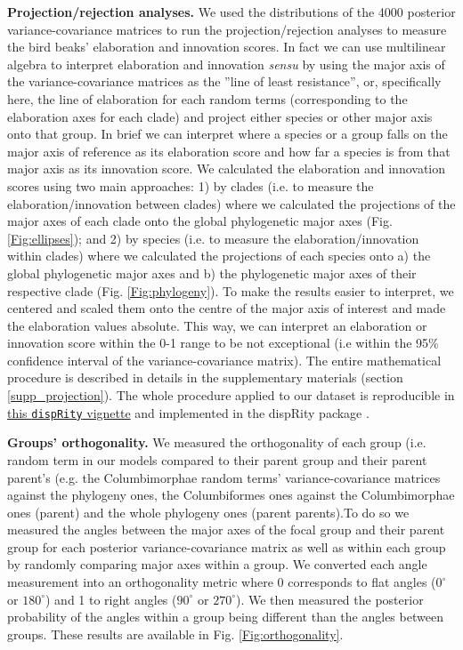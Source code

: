 \documentclass[12pt,letterpaper]{article}
\begin{document}
\textbf{Projection/rejection analyses.}
We used the distributions of the 4000 posterior variance-covariance matrices to run the projection/rejection analyses to measure the bird beaks' elaboration and innovation scores.
In fact we can use multilinear algebra to interpret elaboration and innovation \textit{sensu} \cite{endler2005animal} by using the major axis of the variance-covariance matrices as the ''line of least resistance'', or, specifically here, the line of elaboration for each random terms (corresponding to the elaboration axes for each clade) and project either species or other major axis onto that group.
In brief we can interpret where a species or a group falls on the major axis of reference as its elaboration score and how far a species is from that major axis as its innovation score.
We calculated the elaboration and innovation scores using two main approaches:
1) by clades (i.e. to measure the elaboration/innovation between clades) where we calculated the projections of the major axes of each clade onto the global phylogenetic major axes (Fig. \ref{Fig:ellipses});
and 2) by species (i.e. to measure the elaboration/innovation within clades) where we calculated the projections of each species onto a) the global phylogenetic major axes and b) the phylogenetic major axes of their respective clade (Fig. \ref{Fig:phylogeny}).
To make the results easier to interpret, we centered and scaled them onto the centre of the major axis of interest and made the elaboration values absolute.
This way, we can interpret an elaboration or innovation score within the 0-1 range to be not exceptional (i.e within the 95\% confidence interval of the variance-covariance matrix).
The entire mathematical procedure is described in details in the supplementary materials (section \ref{supp_projection}).
The whole procedure applied to our dataset is reproducible in \href{https://raw.rawgit.net/TGuillerme/dispRity/MCMCglmm/inst/vignettes/model_test_vignette.html}{this \texttt{dispRity} vignette} %
and implemented in the dispRity package \cite{dispRity}.

\textbf{Groups' orthogonality.}
We measured the orthogonality of each group (i.e. random term in our models compared to their parent group and their parent parent's (e.g.
the Columbimorphae random terms' variance-covariance matrices against the phylogeny ones, the Columbiformes ones against the Columbimorphae ones (parent) and the whole phylogeny ones (parent parents).To do so we measured the angles between the major axes of the focal group and their parent group for each posterior variance-covariance matrix as well as within each group by randomly comparing major axes within a group.
We converted each angle measurement into an orthogonality metric where 0 corresponds to flat angles ($0^\circ$ or  $180^\circ$) and 1 to right angles ($90^\circ$ or $270^\circ$).
We then measured the posterior probability of the angles within a group being different than the angles between groups.
These results are available in Fig. \ref{Fig:orthogonality}.




\end{document}
